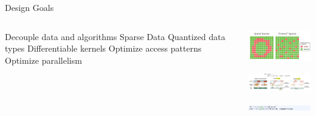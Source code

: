 \placelogofalse
\begin{frame}{Design Goals}
\begin{columns}
  \begin{outline}
    \1 Decouple data and algorithms
    \2 Sparse Data
    \2 Quantized data types
    \1 Differentiable kernels
    \1 Optimize access patterns
    \1 Optimize parallelism
  \end{outline}

  \centering
  \begin{center}
  \includegraphics[width=5.0cm]{taichi_sparsity.png}

  \vspace{0.75cm}

  \includegraphics[width=6.0cm]{access_pattern.png}

  \vspace{0.75cm}

  \includegraphics[width=6.0cm]{quantized_types.png}
  \end{center}
\end{columns}
\end{frame}
\placelogotrue
